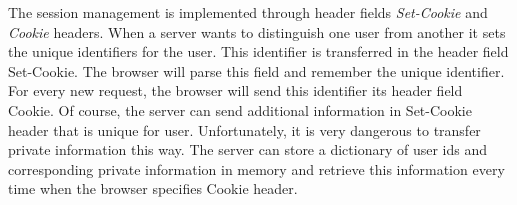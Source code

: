The session management is implemented through header fields  \textit{Set-Cookie} and \textit{Cookie} headers. When a server wants to distinguish one user from another it sets the unique identifiers for the user. This identifier is transferred in the header field Set-Cookie. The browser will parse this field and remember the unique identifier. For every new request, the browser will send this identifier its header field Cookie. Of course, the server can send additional information in Set-Cookie header that is unique for user. Unfortunately, it is very dangerous to transfer private information this way. The server can store a dictionary of user ids and corresponding private information in memory and retrieve this information every time when the browser specifies Cookie header. 


\newpage


